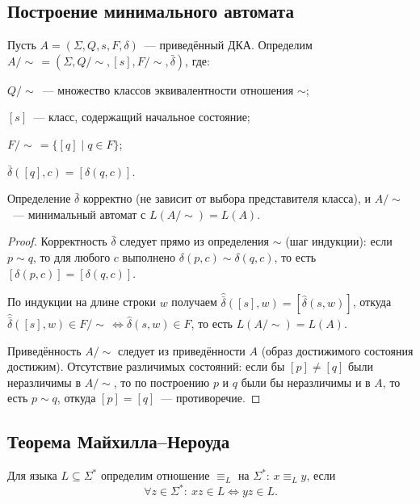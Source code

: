 \documentclass[12pt]{article}
\begin{document}
	\subsection{Построение минимального автомата}
	
	\begin{definition}
		Пусть $A = (\Sigma, Q, s, F, \delta)$~--- приведённый ДКА. Определим $A / \sim \, = (\Sigma, Q/\sim, [s], F/\sim, \bar\delta)$, где:
		
		$Q/\sim$~--- множество классов эквивалентности отношения $\sim$;
		
		$[s]$~--- класс, содержащий начальное состояние;
		
		$F/\sim \, = \{ [q] \mid q \in F \}$;
		
		$\bar\delta([q], c) = [\delta(q, c)]$.
	\end{definition}
	
	\begin{statement}
		Определение $\bar\delta$ корректно (не зависит от выбора представителя класса), и $A / \sim$~--- минимальный автомат с $L(A/\sim) = L(A)$.
	\end{statement}
	
	\begin{proof}
		Корректность $\bar\delta$ следует прямо из определения $\sim$ (шаг индукции): если $p \sim q$, то для любого $c$ выполнено $\delta(p, c) \sim \delta(q, c)$, то есть $[\delta(p,c)] = [\delta(q,c)]$.
		
		По индукции на длине строки $w$ получаем $\hat{\bar\delta}([s], w) = [\hat\delta(s, w)]$, откуда $\hat{\bar\delta}([s], w) \in F/\sim \, \Leftrightarrow \hat\delta(s, w) \in F$, то есть $L(A/\sim) = L(A)$.
		
		Приведённость $A/\sim$ следует из приведённости $A$ (образ достижимого состояния достижим). Отсутствие различимых состояний: если бы $[p] \neq [q]$ были неразличимы в $A/\sim$, то по построению $p$ и $q$ были бы неразличимы и в $A$, то есть $p \sim q$, откуда $[p] = [q]$~--- противоречие.
	\end{proof}
	
	\subsection{Теорема Майхилла--Нероуда}
	
	\begin{definition}
		Для языка $L \subseteq \Sigma^*$ определим отношение $\equiv_L$ на $\Sigma^*$: $x \equiv_L y$, если
		\[
		\forall z \in \Sigma^* : \ xz \in L \Leftrightarrow yz \in L.
		\]
	\end{definition}
	
\end{document}
